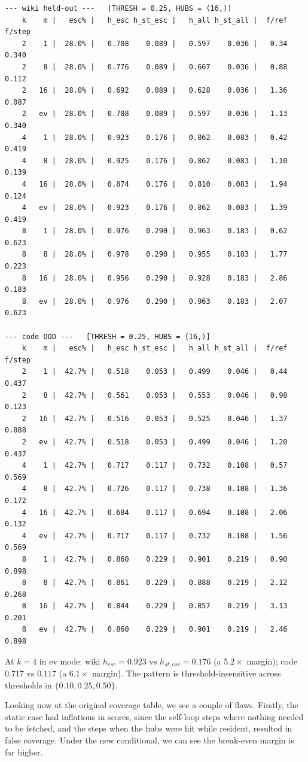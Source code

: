 \documentclass[11pt,a4paper]{article}
\begin{document}
{\footnotesize
\begin{verbatim}
--- wiki held-out ---   [THRESH = 0.25, HUBS = (16,)]
    k    m |   esc% |   h_esc h_st_esc |   h_all h_st_all |  f/ref  f/step
    2    1 |  28.0% |   0.708    0.089 |   0.597    0.036 |   0.34   0.340
    2    8 |  28.0% |   0.776    0.089 |   0.667    0.036 |   0.88   0.112
    2   16 |  28.0% |   0.692    0.089 |   0.628    0.036 |   1.36   0.087
    2   ev |  28.0% |   0.708    0.089 |   0.597    0.036 |   1.13   0.340
    4    1 |  28.0% |   0.923    0.176 |   0.862    0.083 |   0.42   0.419
    4    8 |  28.0% |   0.925    0.176 |   0.862    0.083 |   1.10   0.139
    4   16 |  28.0% |   0.874    0.176 |   0.810    0.083 |   1.94   0.124
    4   ev |  28.0% |   0.923    0.176 |   0.862    0.083 |   1.39   0.419
    8    1 |  28.0% |   0.976    0.290 |   0.963    0.183 |   0.62   0.623
    8    8 |  28.0% |   0.978    0.290 |   0.955    0.183 |   1.77   0.223
    8   16 |  28.0% |   0.956    0.290 |   0.928    0.183 |   2.86   0.183
    8   ev |  28.0% |   0.976    0.290 |   0.963    0.183 |   2.07   0.623

--- code OOD ---   [THRESH = 0.25, HUBS = (16,)]
    k    m |   esc% |   h_esc h_st_esc |   h_all h_st_all |  f/ref  f/step
    2    1 |  42.7% |   0.518    0.053 |   0.499    0.046 |   0.44   0.437
    2    8 |  42.7% |   0.561    0.053 |   0.553    0.046 |   0.98   0.123
    2   16 |  42.7% |   0.516    0.053 |   0.525    0.046 |   1.37   0.088
    2   ev |  42.7% |   0.518    0.053 |   0.499    0.046 |   1.20   0.437
    4    1 |  42.7% |   0.717    0.117 |   0.732    0.108 |   0.57   0.569
    4    8 |  42.7% |   0.726    0.117 |   0.738    0.108 |   1.36   0.172
    4   16 |  42.7% |   0.684    0.117 |   0.694    0.108 |   2.06   0.132
    4   ev |  42.7% |   0.717    0.117 |   0.732    0.108 |   1.56   0.569
    8    1 |  42.7% |   0.860    0.229 |   0.901    0.219 |   0.90   0.898
    8    8 |  42.7% |   0.861    0.229 |   0.888    0.219 |   2.12   0.268
    8   16 |  42.7% |   0.844    0.229 |   0.857    0.219 |   3.13   0.201
    8   ev |  42.7% |   0.860    0.229 |   0.901    0.219 |   2.46   0.898
\end{verbatim}
}

At $k=4$ in ev mode: wiki $h_{esc} = 0.923$ vs $h_{st,esc} = 0.176$ (a $5.2\times$ margin); code $0.717$ vs $0.117$ (a $6.1\times$ margin). The pattern is threshold-insensitive across thresholds in $\{0.10, 0.25, 0.50\}$.

Looking now at the original coverage table, we see a couple of flaws. Firstly, the static case had inflations in scores, since the self-loop steps where nothing needed to be fetched, and the steps when the hubs were hit while resident, resulted in false coverage. Under the new conditional, we can see the break-even margin is far higher.
\end{document}
